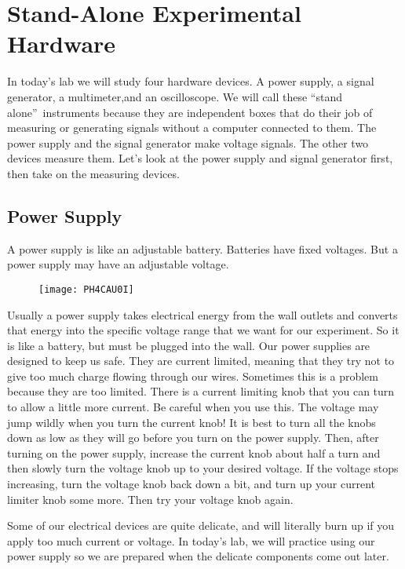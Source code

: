 \section{Stand-Alone Experimental Hardware}

In today's lab we will study four hardware devices. A power supply, a signal
generator, a multimeter,and an oscilloscope. We will call these
\textquotedblleft stand alone\textquotedblright\ instruments because they
are independent boxes that do their job of measuring or generating signals
without a computer connected to them. The power supply and the signal
generator make voltage signals. The other two devices measure them. Let's
look at the power supply and signal generator first, then take on the
measuring devices.

\subsection{Power Supply}

A power supply is like an adjustable battery. Batteries have fixed voltages.
But a power supply may have an adjustable voltage. 

\begin{figure}[h!]
	\centering
	\texttt{[image: PH4CAU0I]}
\end{figure}

Usually a power supply takes
electrical energy from the wall outlets and converts that energy into the
specific voltage range that we want for our experiment. So it is like a
battery, but must be plugged into the wall. Our power supplies are designed
to keep us safe. They are current limited, meaning that they try not to give
too much charge flowing through our wires. Sometimes this is a problem
because they are too limited. There is a current limiting knob that you can
turn to allow a little more current. Be careful when you use this. The
voltage may jump wildly when you turn the current knob! It is best to turn
all the knobs down as low as they will go before you turn on the power
supply. Then, after turning on the power supply, increase the current knob
about half a turn and then slowly turn the voltage knob up to your desired
voltage. If the voltage stops increasing, turn the voltage knob back down a
bit, and turn up your current limiter knob some more. Then try your voltage
knob again.

Some of our electrical devices are quite delicate, and will literally burn
up if you apply too much current or voltage. In today's lab, we will
practice using our power supply so we are prepared when the delicate
components come out later.

